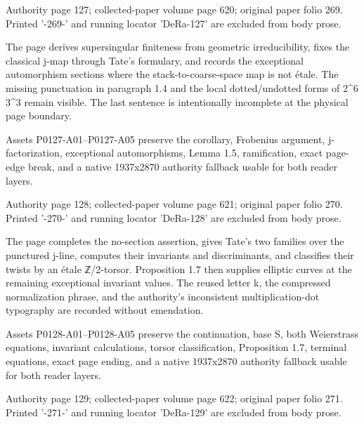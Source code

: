 \documentclass[11pt,a4paper]{article}
\begin{document}
\par\medskip
\hypertarget{D018-P0127}{}
\par\smallskip
Authority page 127; collected-paper volume page 620; original paper folio 269. Printed '-269-' and running locator 'DeRa-127' are excluded from body prose.

The page derives supersingular finiteness from geometric irreducibility, fixes the classical j-map through Tate's formulary, and records the exceptional automorphism sections where the stack-to-coarse-space map is not étale. The missing punctuation in paragraph 1.4 and the local dotted/undotted forms of 2\textasciicircum{}6 3\textasciicircum{}3 remain visible. The last sentence is intentionally incomplete at the physical page boundary.

Assets P0127-A01--P0127-A05 preserve the corollary, Frobenius argument, j-factorization, exceptional automorphisms, Lemma 1.5, ramification, exact page-edge break, and a native 1937x2870 authority fallback usable for both reader layers.


\par\medskip
\hypertarget{D018-P0128}{}
\par\smallskip
Authority page 128; collected-paper volume page 621; original paper folio 270. Printed '-270-' and running locator 'DeRa-128' are excluded from body prose.

The page completes the no-section assertion, gives Tate's two families over the punctured j-line, computes their invariants and discriminants, and classifies their twists by an étale ℤ/2-torsor. Proposition 1.7 then supplies elliptic curves at the remaining exceptional invariant values. The reused letter k, the compressed normalization phrase, and the authority's inconsistent multiplication-dot typography are recorded without emendation.

Assets P0128-A01--P0128-A05 preserve the continuation, base S, both Weierstrass equations, invariant calculations, torsor classification, Proposition 1.7, terminal equations, exact page ending, and a native 1937x2870 authority fallback usable for both reader layers.


\par\medskip
\hypertarget{D018-P0129}{}
\par\smallskip
Authority page 129; collected-paper volume page 622; original paper folio 271. Printed '-271-' and running locator 'DeRa-129' are excluded from body prose.
\end{document}
